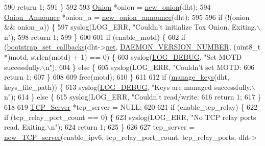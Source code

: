 \begin{DoxyCode}
{{{{590         \textcolor{keywordflow}{return} 1;
591     \}
592 
593     \hyperlink{struct_onion}{Onion} *onion = \hyperlink{onion_8c_a71877ec5931feec418ed1ae10b0963d8}{new\_onion}(dht);
594     \hyperlink{struct_onion___announce}{Onion\_Announce} *onion\_a = \hyperlink{onion__announce_8c_a1807a1d99b93e29c2a27648afe3e6c2c}{new\_onion\_announce}(dht);
595 
596     \textcolor{keywordflow}{if} (!(onion && onion\_a)) \{
597         syslog(LOG\_ERR, \textcolor{stringliteral}{"Couldn't initialize Tox Onion. Exiting.\(\backslash\)n"});
598         \textcolor{keywordflow}{return} 1;
599     \}
600 
601     \textcolor{keywordflow}{if} (enable\_motd) \{
602         \textcolor{keywordflow}{if} (\hyperlink{bootstrap__node__packets_8c_af45f0ce6a723f57dc9f667f2fcd4772c}{bootstrap\_set\_callbacks}(dht->\hyperlink{struct_d_h_t_aa14ea2f67950f57fe4235d7375a2216c}{net}, 
      \hyperlink{tox-bootstrapd_8c_a63112447ca129c284247c8b29b32b838}{DAEMON\_VERSION\_NUMBER}, (uint8\_t *)motd, strlen(motd) + 1) == 0) \{
603             syslog(\hyperlink{logger_8h_aa5a9053636a30269210c54e734e0d583ab9f002c6ffbfd511da8090213227454e}{LOG\_DEBUG}, \textcolor{stringliteral}{"Set MOTD successfully.\(\backslash\)n"});
604         \} \textcolor{keywordflow}{else} \{
605             syslog(LOG\_ERR, \textcolor{stringliteral}{"Couldn't set MOTD: %
606             \textcolor{keywordflow}{return} 1;
607         \}
608 
609         free(motd);
610     \}
611 
612     \textcolor{keywordflow}{if} (\hyperlink{tox-bootstrapd_8c_a0a4dac6d686a3a976d578eb81322a81e}{manage\_keys}(dht, keys\_file\_path)) \{
613         syslog(\hyperlink{logger_8h_aa5a9053636a30269210c54e734e0d583ab9f002c6ffbfd511da8090213227454e}{LOG\_DEBUG}, \textcolor{stringliteral}{"Keys are managed successfully.\(\backslash\)n"});
614     \} \textcolor{keywordflow}{else} \{
615         syslog(LOG\_ERR, \textcolor{stringliteral}{"Couldn't read/write: %
616         \textcolor{keywordflow}{return} 1;
617     \}
618 
619     \hyperlink{struct_t_c_p___server}{TCP\_Server} *tcp\_server = NULL;
620 
621     \textcolor{keywordflow}{if} (enable\_tcp\_relay) \{
622         \textcolor{keywordflow}{if} (tcp\_relay\_port\_count == 0) \{
623             syslog(LOG\_ERR, \textcolor{stringliteral}{"No TCP relay ports read. Exiting.\(\backslash\)n"});
624             \textcolor{keywordflow}{return} 1;
625         \}
626 
627         tcp\_server = \hyperlink{_t_c_p__server_8c_a148e632f4c51645cbc1b414bc3584b60}{new\_TCP\_server}(enable\_ipv6, tcp\_relay\_port\_count, tcp\_relay\_ports, dht->
}}}}}}
\end{DoxyCode}
